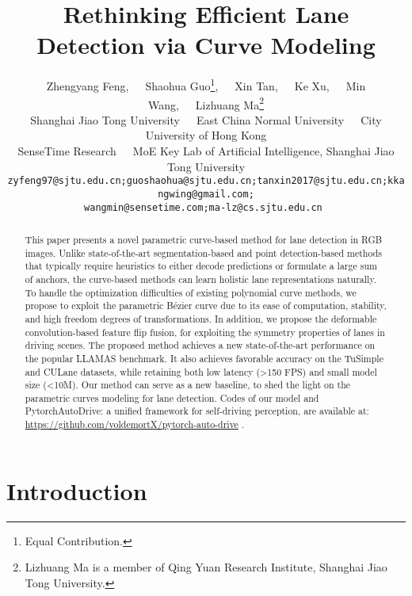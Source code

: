 \documentclass[10pt,twocolumn,letterpaper]{article}
\begin{document}
\title{Rethinking Efficient Lane Detection via Curve Modeling}

\author{Zhengyang Feng,~~~Shaohua Guo\thanks{Equal Contribution.},~~~Xin Tan,~~~Ke Xu,~~~Min Wang,~~~Lizhuang Ma\thanks{Lizhuang Ma is a member of Qing Yuan Research Institute, Shanghai Jiao Tong University.}\\
Shanghai Jiao Tong University~~~East China Normal University~~~City University of Hong Kong\\SenseTime Research~~~MoE Key Lab of Artificial Intelligence, Shanghai Jiao Tong University\\
\tt\small zyfeng97@sjtu.edu.cn;guoshaohua@sjtu.edu.cn;tanxin2017@sjtu.edu.cn;kkangwing@gmail.com;\\
\tt\small wangmin@sensetime.com;ma-lz@cs.sjtu.edu.cn
}




\maketitle



\begin{abstract}
   This paper presents a novel parametric curve-based method for lane detection in RGB images.
   Unlike state-of-the-art segmentation-based and point detection-based methods that typically require heuristics to either decode predictions or formulate a large sum of anchors, the curve-based methods can learn holistic lane representations naturally.
   To handle the optimization difficulties of existing polynomial curve methods, we propose to exploit the parametric Bézier curve due to its ease of computation, stability, and high freedom degrees of transformations.
   In addition, we propose the deformable convolution-based feature flip fusion, for exploiting the symmetry properties of lanes in driving scenes.
   The proposed method achieves a new state-of-the-art performance on the popular LLAMAS benchmark. It also achieves favorable accuracy on the TuSimple and CULane datasets, while retaining both low latency (\textgreater 150 FPS) and small model size (\textless 10M). 
   Our method can serve as a new baseline, to shed the light on the parametric curves modeling for lane detection. Codes of our model and PytorchAutoDrive: a unified framework for self-driving perception, are available at: \url{https://github.com/voldemortX/pytorch-auto-drive} .
\end{abstract}


\section{Introduction}
\label{sec:intro}
\end{document}
